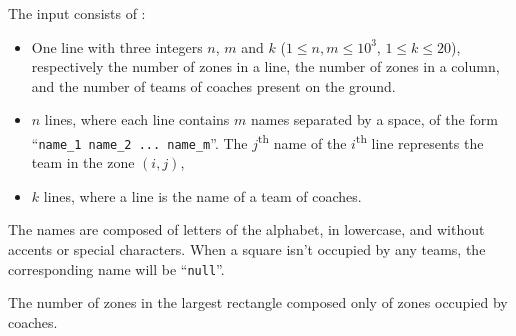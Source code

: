 \begin{Input}
	The input consists of :
	\begin{itemize}
		\item One line with three integers $n$, $m$ and $k$ ($1 \le n,m \le 10^3$, $1 \le k \le 20$), respectively the number of zones in a line, the number of zones in a column, and the number of teams of coaches present on the ground.
		\item $n$ lines, where each line contains $m$ names separated by a space, of the form ``\verb|name_1 name_2 ... name_m|''. The $j$\textsuperscript{th} name of the $i$\textsuperscript{th} line represents the team in the zone $(i,j)$,
		\item $k$ lines, where a line is the name of a team of coaches.
	\end{itemize}
	The names are composed of letters of the alphabet, in lowercase, and without accents or special characters.
	When a square isn't occupied by any teams, the corresponding name will be ``\verb|null|''.
\end{Input}

\begin{Output}
	 The number of zones in the largest rectangle composed only of zones occupied by coaches.
\end{Output}
